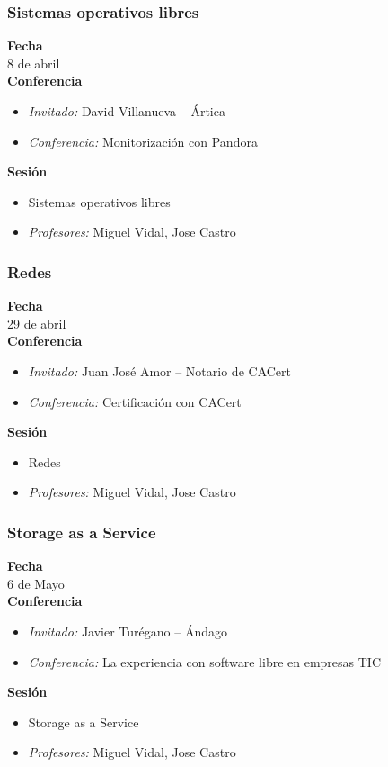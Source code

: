 \documentclass{beamer}
\begin{document}
\begin{frame}
  \frametitle{Sistemas operativos libres}
  \textbf{Fecha}\\
  \hspace{0.3cm}8 de abril\\
  \textbf{Conferencia}
    \begin{itemize}
      \item \textit{Invitado:} David Villanueva -- Ártica
      \item \textit{Conferencia:} Monitorización con Pandora
    \end{itemize}
  \textbf{Sesión}
    \begin{itemize}
      \item Sistemas operativos libres
      \item \textit{Profesores:} Miguel Vidal, Jose Castro
    \end{itemize}
\end{frame}

\begin{frame}
  \frametitle{Redes}
  \textbf{Fecha}\\
  \hspace{0.3cm}29 de abril\\
  \textbf{Conferencia}
    \begin{itemize}
      \item \textit{Invitado:} Juan José Amor -- Notario de CACert
      \item \textit{Conferencia:} Certificación con CACert
    \end{itemize}
  \textbf{Sesión}
    \begin{itemize}
      \item Redes
      \item \textit{Profesores:} Miguel Vidal, Jose Castro
    \end{itemize}
\end{frame}

\begin{frame}
  \frametitle{Storage as a Service}
  \textbf{Fecha}\\
  \hspace{0.3cm}6 de Mayo\\
  \textbf{Conferencia}
    \begin{itemize}
      \item \textit{Invitado:} Javier Turégano -- Ándago
      \item \textit{Conferencia:} La experiencia con software libre en empresas TIC
    \end{itemize}
  \textbf{Sesión}
    \begin{itemize}
      \item Storage as a Service
      \item \textit{Profesores:} Miguel Vidal, Jose Castro
    \end{itemize}
\end{frame}
\end{document}
